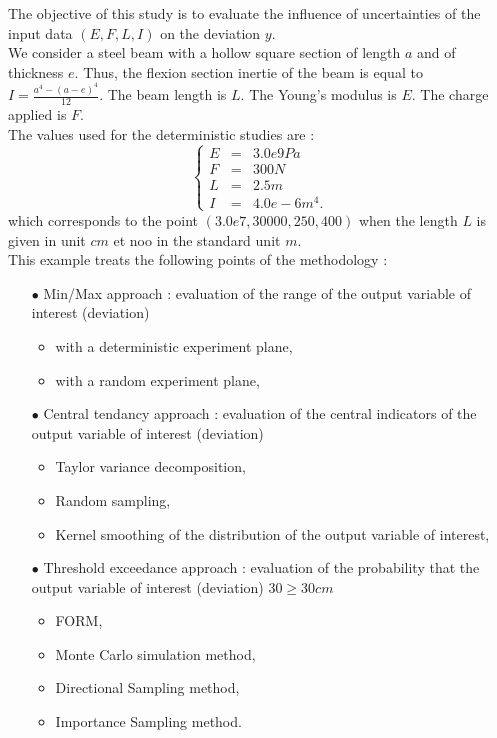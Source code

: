 \documentclass[11pt]{article}
\begin{document}
The objective of this study is to evaluate the influence of uncertainties of the input data $(E, F, L, I)$ on the deviation $y$.\\

We consider a steel beam with a hollow square section of length $a$ and of thickness $e$. Thus, the flexion section inertie of the beam is equal to $I = \displaystyle \frac{a^4 - (a-e)^4}{12}$. The beam length is $L$. The Young's modulus is $E$. The charge applied is $F$.\\

The  values used for the deterministic studies are :
$$
\left\{
  \begin{array}{lcl}
    E & = & 3.0e9 Pa\\
    F & = & 300 N\\
    L & = & 2.5m\\
    I & = & 4.0e-6 m^4.
  \end{array}
\right.
$$
which corresponds to the point $(3.0e7, 30000, 250, 400)$ when the length $L$ is given in unit $cm$ et noo in the standard unit $m$.\\


This example treats the following points of the methodology :
\begin{itemize}
\item[$\bullet$] Min/Max approach : evaluation of the range of the output variable of interest (deviation)
  \begin{itemize}
  \item with a deterministic experiment plane,
  \item with a random experiment plane,
  \end{itemize}
\item[$\bullet$] Central tendancy approach : evaluation of the central indicators of the output variable of interest (deviation)
  \begin{itemize}
  \item Taylor variance decomposition,
  \item Random sampling,
  \item Kernel smoothing of the distribution of the output variable of interest,
  \end{itemize}
\item[$\bullet$] Threshold exceedance approach : evaluation of the probability that the output variable of interest (deviation) 30$\geq 30cm$
  \begin{itemize}
  \item FORM,
  \item Monte Carlo simulation method,
  \item Directional Sampling method,
  \item Importance Sampling method.
  \end{itemize}
\end{itemize}
\end{document}
